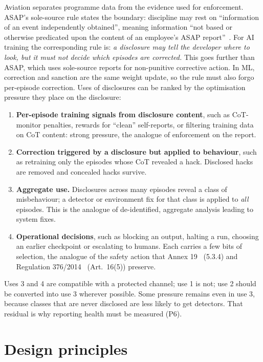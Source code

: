 \documentclass[review,12pt]{elsarticle}
\begin{document}
Aviation separates programme data from the evidence used for enforcement. ASAP's sole-source rule states the boundary: discipline may rest on ``information of an event independently obtained'', meaning information ``not based or otherwise predicated upon the content of an employee's ASAP report''~\cite[para.~16.4, Note]{faa2020}. For AI training the corresponding rule is: \emph{a disclosure may tell the developer where to look, but it must not decide which episodes are corrected.} This goes further than ASAP, which uses sole-source reports for non-punitive corrective action. In ML, correction and sanction are the same weight update, so the rule must also forgo per-episode correction. Uses of disclosures can be ranked by the optimisation pressure they place on the disclosure:

\begin{enumerate}
\item \textbf{Per-episode training signals from disclosure content}, such as CoT-monitor penalties, rewards for ``clean'' self-reports, or filtering training data on CoT content: strong pressure, the analogue of enforcement on the report.
\item \textbf{Correction triggered by a disclosure but applied to behaviour}, such as retraining only the episodes whose CoT revealed a hack. Disclosed hacks are removed and concealed hacks survive.
\item \textbf{Aggregate use.} Disclosures across many episodes reveal a class of misbehaviour; a detector or environment fix for that class is applied to \emph{all} episodes. This is the analogue of de-identified, aggregate analysis leading to system fixes.
\item \textbf{Operational decisions}, such as blocking an output, halting a run, choosing an earlier checkpoint or escalating to humans. Each carries a few bits of selection, the analogue of the safety action that Annex 19~\cite{icao2016} (5.3.4) and Regulation 376/2014~\cite{eu376} (Art.~16(5)) preserve.
\end{enumerate}

Uses 3 and 4 are compatible with a protected channel; use 1 is not; use 2 should be converted into use 3 wherever possible. Some pressure remains even in use 3, because classes that are never disclosed are less likely to get detectors. That residual is why reporting health must be measured (P6).

\section{Design principles}\label{sec:principles}
\end{document}

